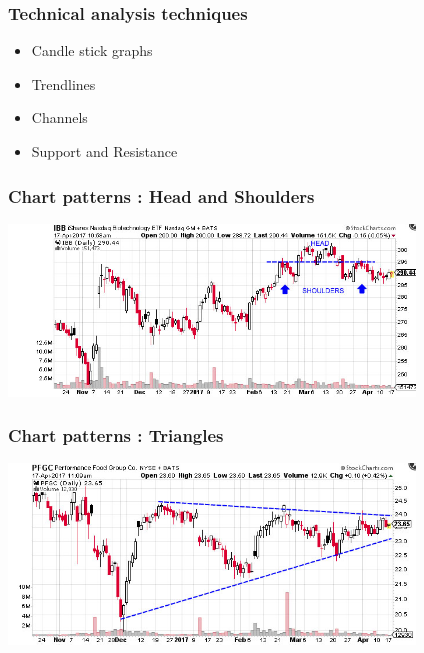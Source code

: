 \documentclass{beamer}
\begin{document}
\begin{frame}
  \frametitle{Technical analysis techniques}
  \begin{itemize}
  \item Candle stick graphs
  \item Trendlines
  \item Channels
  \item Support and Resistance
  \end{itemize}
\end{frame}
\begin{frame}
  \frametitle{Chart patterns : Head and Shoulders}
  \includegraphics[width=10.8cm]{22new.jpg}
\end{frame}
\begin{frame}
  \frametitle{Chart patterns : Triangles}
  \includegraphics[width=10.8cm]{25new.jpg}
\end{frame}
\end{document}
